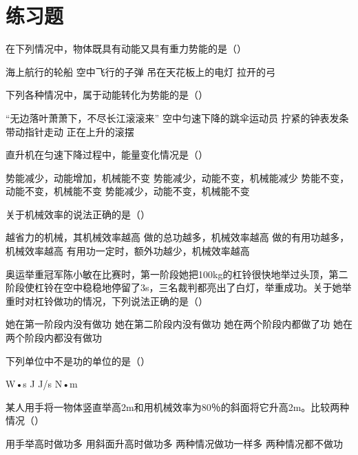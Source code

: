 \documentclass[12pt]{exam}
\begin{document}
\section{练习题}
\begin{questions}
\question
在下列情况中，物体既具有动能又具有重力势能的是（\answerline*[B]）
\begin{choices}
\choice 海上航行的轮船
\choice 空中飞行的子弹
\choice 吊在天花板上的电灯
\choice 拉开的弓
\end{choices}

\question
下列各种情况中，属于动能转化为势能的是（\answerline*[D]）
\begin{choices}
\choice “无边落叶萧萧下，不尽长江滚滚来”
\choice 空中匀速下降的跳伞运动员
\choice 拧紧的钟表发条带动指针走动
\choice 正在上升的滚摆
\end{choices}

\question
直升机在匀速下降过程中，能量变化情况是（\answerline*[B]）
\begin{choices}
\choice 势能减少，动能增加，机械能不变
\choice 势能减少，动能不变，机械能减少
\choice 势能不变，动能不变，机械能不变
\choice 势能减少，动能不变，机械能不变
\end{choices}

\question
关于机械效率的说法正确的是（\answerline*[D]）
\begin{choices}
\choice 越省力的机械，其机械效率越高
\choice 做的总功越多，机械效率越高
\choice 做的有用功越多，机械效率越高
\choice 有用功一定时，额外功越少，机械效率越高
\end{choices}

\question
奥运举重冠军陈小敏在比赛时，第一阶段她把100kg的杠铃很快地举过头顶，第二阶段使杠铃在空中稳稳地停留了3s，三名裁判都亮出了白灯，举重成功。关于她举重时对杠铃做功的情况，下列说法正确的是（\answerline*[B]）
\begin{choices}
\choice 她在第一阶段内没有做功
\choice 她在第二阶段内没有做功
\choice 她在两个阶段内都做了功
\choice 她在两个阶段内都没有做功
\end{choices}

\question
下列单位中不是功的单位的是（\answerline*[C]）
\begin{choices}
\choice W•s
\choice J
\choice J/s
\choice N•m
\end{choices}

\question
某人用手将一物体竖直举高2m和用机械效率为80％的斜面将它升高2m。比较两种情况（\answerline*[B]）
\begin{choices}
\choice 用手举高时做功多
\choice 用斜面升高时做功多
\choice 两种情况做功一样多
\choice 两种情况都不做功
\end{choices}


\end{questions}
\end{document}
